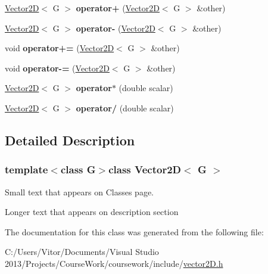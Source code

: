 \begin{DoxyCompactItemize}
\item 
\hypertarget{class_vector2_d_ad909dd1f21da8061bf6d07b49ff34fd4}{}\hyperlink{class_vector2_d}{Vector2\+D}$<$ G $>$ {\bfseries operator+} (\hyperlink{class_vector2_d}{Vector2\+D}$<$ G $>$ \&other)\label{class_vector2_d_ad909dd1f21da8061bf6d07b49ff34fd4}

\item 
\hypertarget{class_vector2_d_ad596163bb0fd596e54908b0205399562}{}\hyperlink{class_vector2_d}{Vector2\+D}$<$ G $>$ {\bfseries operator-\/} (\hyperlink{class_vector2_d}{Vector2\+D}$<$ G $>$ \&other)\label{class_vector2_d_ad596163bb0fd596e54908b0205399562}

\item 
\hypertarget{class_vector2_d_aa942145570266bd0542ed4fa5f7566ea}{}void {\bfseries operator+=} (\hyperlink{class_vector2_d}{Vector2\+D}$<$ G $>$ \&other)\label{class_vector2_d_aa942145570266bd0542ed4fa5f7566ea}

\item 
\hypertarget{class_vector2_d_ad2a09c22b855df93971a7f6c5abe6c39}{}void {\bfseries operator-\/=} (\hyperlink{class_vector2_d}{Vector2\+D}$<$ G $>$ \&other)\label{class_vector2_d_ad2a09c22b855df93971a7f6c5abe6c39}

\item 
\hypertarget{class_vector2_d_a1dafa1de876f5527a254b043f633c57a}{}\hyperlink{class_vector2_d}{Vector2\+D}$<$ G $>$ {\bfseries operator$\ast$} (double scalar)\label{class_vector2_d_a1dafa1de876f5527a254b043f633c57a}

\item 
\hypertarget{class_vector2_d_a4b9d085f69889b8dccb1cf3993965713}{}\hyperlink{class_vector2_d}{Vector2\+D}$<$ G $>$ {\bfseries operator/} (double scalar)\label{class_vector2_d_a4b9d085f69889b8dccb1cf3993965713}

\end{DoxyCompactItemize}


\subsection{Detailed Description}
\subsubsection*{template$<$class G$>$class Vector2\+D$<$ G $>$}

Small text that appears on Classes page. 

Longer text that appears on description section 

The documentation for this class was generated from the following file\+:\begin{DoxyCompactItemize}
\item 
C\+:/\+Users/\+Vitor/\+Documents/\+Visual Studio 2013/\+Projects/\+Course\+Work/coursework/include/\hyperlink{vector2_d_8h}{vector2\+D.\+h}\end{DoxyCompactItemize}
